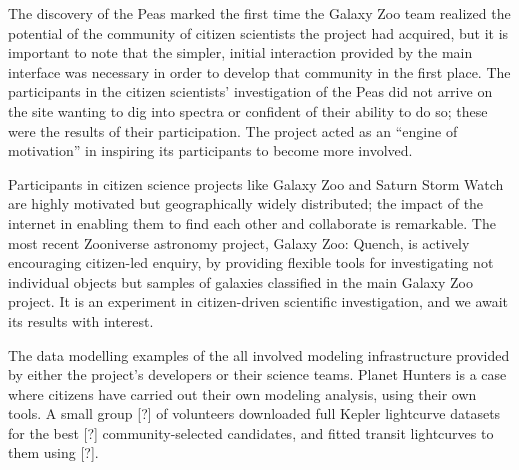 \documentclass{ar2e}
\begin{document}
The discovery of the Peas marked the first time the Galaxy Zoo team realized the
potential of the community of citizen scientists the project had acquired, but
it is important to note that the simpler, initial interaction provided by the
main interface was necessary in order to develop that community in the first
place. The participants in the citizen scientists' investigation of the Peas did
not arrive on the site wanting to dig into spectra or confident of their ability
to do so; these were the results of their participation. The project  acted as
an ``engine of motivation'' in inspiring its participants to become more
involved. 


Participants in citizen science projects like Galaxy Zoo and Saturn Storm Watch 
are highly motivated but geographically widely distributed; the impact of the
internet in enabling them to find each other and collaborate is remarkable. The
most recent Zooniverse astronomy project, Galaxy Zoo: Quench, is actively
encouraging citizen-led enquiry, by providing flexible tools for investigating
not individual objects but samples of galaxies classified in the main Galaxy Zoo
project. It is an experiment in citizen-driven scientific investigation, and we
await its results with interest.


% 
%

  The data modelling
examples of the  all involved modeling infrastructure provided
by either the project's developers or their science teams. Planet Hunters is a
case where citizens have carried out their own modeling analysis, using their
own tools. A small group [?] of volunteers downloaded full Kepler lightcurve
datasets for the best [?] community-selected candidates, and fitted transit
lightcurves to them using [?]. 

\end{document}
